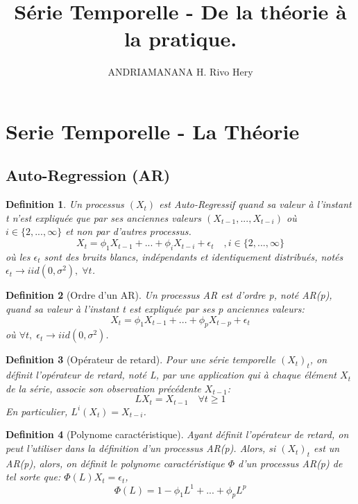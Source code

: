 \documentclass{article}
\title{Série Temporelle - De la théorie à la pratique.}
\author{ANDRIAMANANA H. Rivo Hery}
\newtheorem{definition}{Definition}[section]
\begin{document}
\maketitle

\section{Serie Temporelle - La Théorie}

\subsection{Auto-Regression (AR)}

\begin{definition}
Un processus $(X_t)$ est Auto-Regressif quand sa valeur à l'instant t n'est expliquée que par ses anciennes valeurs $(X_{t-1},...,X_{t-i})$ où $i\in\{2,...,\infty\}$ et non par d'autres processus.
$$X_t=\phi_1{X_{t-1}}+...+\phi_i{X_{t-i}}+\epsilon_t \quad ,i\in\{2,...,\infty\}$$
où les $\epsilon_t$ sont des bruits blancs, indépendants et identiquement distribués, notés $\epsilon_t \rightarrow iid(0,\sigma^2), \; \forall t$.
\end{definition}

\begin{definition}[Ordre d'un AR]
Un processus AR est d'ordre p, noté AR(p), quand sa valeur à l'instant t est expliquée par ses p anciennes valeurs: 
$$X_t=\phi_1{X_{t-1}}+...+\phi_p{X_{t-p}}+\epsilon_t$$
où $\forall t, \; \epsilon_t \rightarrow iid(0,\sigma^2)$.
\end{definition}

\begin{definition}[Opérateur de retard]
Pour une série temporelle $(X_t)_t$, on définit l'opérateur de retard, noté L, par une application qui à chaque élément $X_t$ de la série, associe son observation précédente $X_{t-1}$:
$$LX_t=X_{t-1} \quad \forall t \ge 1 $$
En particulier, $L^i(X_t)=X_{t-i}$.
\end{definition}

\begin{definition}[Polynome caractéristique]
Ayant définit l'opérateur de retard, on peut l'utiliser dans la définition d'un processus AR(p).
\newline
Alors, si $(X_t)_t$ est un AR(p), alors, on définit le polynome caractéristique $\Phi$ d'un processus AR(p) de tel sorte que: $\Phi(L){X_t}=\epsilon_t$,
$$\Phi(L)=1-\phi_1{L^1}+...+\phi_p{L^p}$$
\end{definition}
\end{document}
